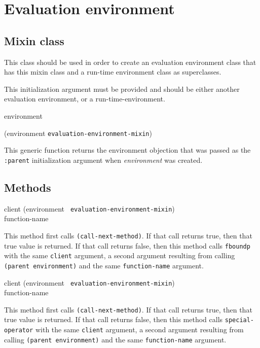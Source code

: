 \chapter{Evaluation environment}

\section{Mixin class}


This class should be used in order to create an evaluation environment
class that has this mixin class and a run-time environment class as
superclasses.


This initialization argument must be provided and should be either
another evaluation environment, or a run-time-environment.

 {environment}

 {(environment {\tt evaluation-environment-mixin})}

This generic function returns the environment objection that was passed
as the \texttt{:parent} initialization argument when
\textit{environment} was created.

\section{Methods}

{\small{} {client (environment {\tt
      evaluation-environment-mixin}) \\ function-name}
}

This method first calls \texttt{(call-next-method)}.  If that call
returns true, then that true value is returned.  If that call returns
false, then this method calls \texttt{fboundp} with the same
\texttt{client} argument, a second argument resulting from calling
\texttt{(parent environment)} and the same \texttt{function-name}
argument.

{\small{} {client (environment {\tt
      evaluation-environment-mixin}) \\ function-name}
}

This method first calls \texttt{(call-next-method)}.  If that call
returns true, then that true value is returned.  If that call returns
false, then this method calls \texttt{special-operator} with the same
\texttt{client} argument, a second argument resulting from calling
\texttt{(parent environment)} and the same \texttt{function-name}
argument.

